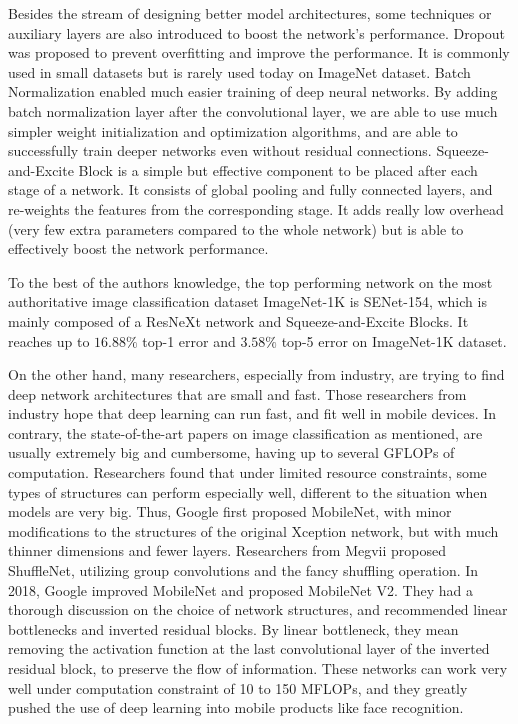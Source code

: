 Besides the stream of designing better model architectures, some techniques or auxiliary layers are also introduced to boost the network's performance. Dropout\cite{srivastava2014dropout} was proposed to prevent overfitting and improve the performance. It is commonly used in small datasets but is rarely used today on ImageNet dataset. Batch Normalization\cite{ioffe2015batch} enabled much easier training of deep neural networks. By adding batch normalization layer after the convolutional layer, we are able to use much simpler weight initialization and optimization algorithms, and are able to successfully train deeper networks even without residual connections\cite{he2016deep}. Squeeze-and-Excite Block\cite{hu2017squeeze} is a simple but effective component to be placed after each stage of a network. It consists of global pooling and fully connected layers, and re-weights the features from the corresponding stage. It adds really low overhead (very few extra parameters compared to the whole network) but is able to effectively boost the network performance.

To the best of the authors knowledge, the top performing network on the most authoritative image classification dataset ImageNet-1K is SENet-154\cite{hu2017squeeze}, which is mainly composed of a ResNeXt network and Squeeze-and-Excite Blocks. It reaches up to $16.88\%$ top-1 error and $3.58\%$ top-5 error on ImageNet-1K dataset.

On the other hand, many researchers, especially from industry, are trying to find deep network architectures that are small and fast. Those researchers from industry hope that deep learning can run fast, and fit well in mobile devices. In contrary, the state-of-the-art papers on image classification as mentioned, are usually extremely big and cumbersome, having up to several GFLOPs of computation. Researchers found that under limited resource constraints, some types of structures can perform especially well, different to the situation when models are very big. Thus, Google first proposed MobileNet\cite{howard2017mobilenets}, with minor modifications to the structures of the original Xception network, but with much thinner dimensions and fewer layers. Researchers from Megvii proposed ShuffleNet\cite{zhang2017shufflenet}, utilizing group convolutions and the fancy shuffling operation. In 2018, Google improved MobileNet and proposed MobileNet V2\cite{sandler2018inverted}. They had a thorough discussion on the choice of network structures, and recommended linear bottlenecks and inverted residual blocks. By linear bottleneck, they mean removing the activation function at the last convolutional layer of the inverted residual block, to preserve the flow of information. These networks can work very well under computation constraint of 10 to 150 MFLOPs, and they greatly pushed the use of deep learning into mobile products like face recognition.


